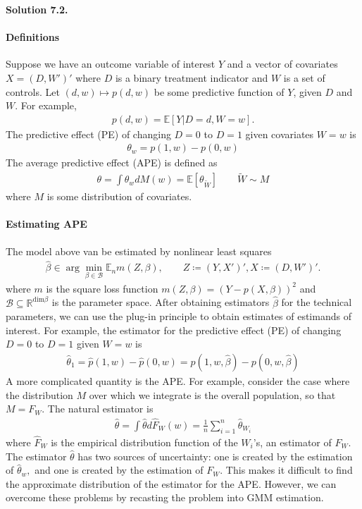 \documentclass[11pt]{article}
\newenvironment{solution}[1]
    {\bigskip\noindent\textbf{Solution #1.} \par}
    {\medskip}
\newcommand{\ev}{\mathbb{E}}
\newcommand{\R}{\mathbb{R}}
\begin{document}
\begin{solution}{7.2}

\paragraph{Definitions}
Suppose we have an outcome variable of interest $Y$ and a vector of covariates $X=(D,W')'$ where $D$ is a binary treatment indicator and $W$ is a set of controls. Let $(d,w) \mapsto p(d,w)$ be some predictive function of $Y$, given $D$ and $W.$ For example,
\begin{align*}
    p(d,w) = \ev[Y | D = d, W = w].
\end{align*}
The predictive effect (PE) of changing $D=0$ to $D=1$ given covariates $W = w$ is 
\begin{align*}
    \theta_w = p(1,w) - p(0,w)
\end{align*}
The average predictive effect (APE) is defined as 
\begin{align*}
    \theta = \int \theta_w dM(w) = \ev[\theta_{\tilde W}] \qquad \tilde{W} \sim M
\end{align*}
where $M$ is some distribution of covariates. 

\paragraph{Estimating APE} The model above van be estimated by nonlinear least squares 
\begin{align*}
    \hat{\beta} \in \arg \min_{\beta \in \mathcal{B}} \ev_n m(Z,\beta), \qquad Z \coloneq (Y,X')', X\coloneq(D,W')'.
\end{align*}
where $m$ is the square loss function $m(Z,\beta) = (Y-p(X,\beta))^2$ and $\mathcal{B} \subseteq \R^{\text{dim} \beta}$ is the parameter space. After obtaining estimators $\hat{\beta}$ for the technical parameters, we can use the plug-in principle to obtain estimates of estimands of interest. For example, the estimator for the predictive effect (PE) of changing $D=0$ to $D=1$ given $W = w$ is
\begin{align*}
    \hat{\theta}_1 = \hat{p}(1,w) - \hat{p}(0,w) = p(1,w,\hat{\beta}) - p(0,w,\hat{\beta})
\end{align*}
A more complicated quantity is the APE. For example, consider the case where the distribution $M$ over which we integrate is the overall population, so that $M = F_W.$ The natural estimator is 
\begin{align*}
    \hat{\theta} = \int \hat{\theta}d\hat{F}_W(w) = \frac{1}{n}\sum_{i=1}^n\hat{\theta}_{W_i}
\end{align*}
where $\hat{F}_W$ is the empirical distribution function of the $W_i$'s, an estimator of $F_W$. The estimator $\hat{\theta}$ has two sources of uncertainty: one is created by the estimation of $\hat{\theta}_w,$ and one is created by the estimation of $F_W.$ This makes it difficult to find the approximate distribution of the estimator for the APE. However, we can overcome these problems by recasting the problem into GMM estimation.


\end{solution}
\end{document}
